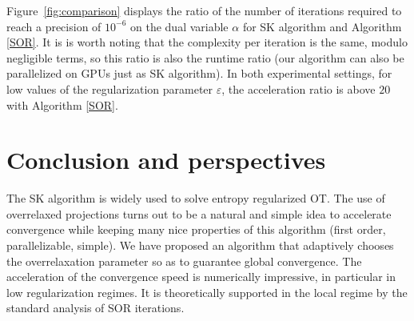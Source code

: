 \documentclass{article} %
\DeclareMathOperator{\IR}{\mathbb{R}}
\DeclareMathOperator{\diag}{diag}
\renewcommand{\epsilon}{\varepsilon}
\theoremstyle{plain}
\theoremstyle{definition}
\theoremstyle{remark}
\begin{document}
 

Figure~\ref{fig:comparison} displays the ratio of the number of iterations required to reach a precision of $10^{-6}$ on the dual variable $\alpha$ for SK algorithm and Algorithm \ref{SOR}. It is is worth noting that the complexity per iteration is the same, modulo negligible terms, so this ratio is also the runtime ratio (our algorithm can also be parallelized on GPUs just as SK algorithm). In both experimental settings, for low values of the regularization parameter $\epsilon$, the acceleration ratio is above $20$  with Algorithm \ref{SOR}.

 
 








\section{Conclusion and perspectives}
The SK algorithm is widely used to solve entropy regularized OT.
The use of overrelaxed projections turns out to be a natural and simple idea to accelerate convergence while keeping many nice properties of this algorithm (first order, parallelizable, simple).
We have proposed an algorithm that adaptively chooses the overrelaxation parameter so as to guarantee global convergence.
The acceleration of the convergence speed is numerically impressive, in particular in low regularization regimes.
It is theoretically supported in the local regime by the standard analysis of SOR iterations.
\end{document}
